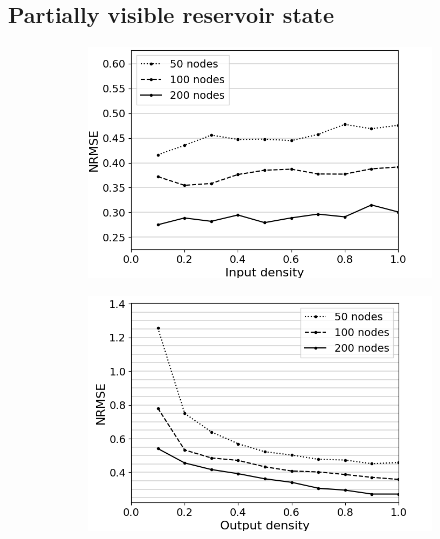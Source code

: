 \subsection{Partially visible reservoir state}

\begin{figure}[htbp]
  \centering
  \begin{subfigure}{.3\textwidth}
    \centering
    \includegraphics[width=\linewidth]{img/input_density_all.png}
    \caption{}
  \end{subfigure}
  \begin{subfigure}{.3\textwidth}
    \centering
    \includegraphics[width=\linewidth]{img/output_density_all.png}
    \caption{}
  \end{subfigure}
  \begin{subfigure}{.3\textwidth}
    \centering

\end{subfigure}
\end{figure}
